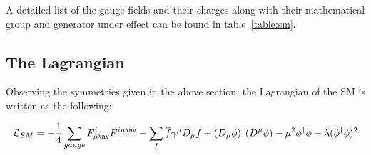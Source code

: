     A detailed list of the gauge fields and their charges along with their mathematical group and generator under effect can be found in table~\ref{table:sm}.

\subsection{The Lagrangian}

Observing the symmetries given in the above section, the Lagrangian of the SM is written as the following:

\begin{equation}
    \mathcal{L}_{SM}= - \frac{1}{4} \sum\limits_{gauge} F^{i}_{\mu \nv}F^{i\mu\nv} - \sum\limits_{f} \overline{f} \gamma^{\mu} D_{\mu} f +(D_{\mu}\phi)^{\dagger}(D^{\mu}\phi) - \mu^{2}\phi^{\dagger}\phi - \lambda(\phi^{\dagger}\phi)^{2}
    \label{eq:SMLagrangian}
\end{equation}


%
%
%

